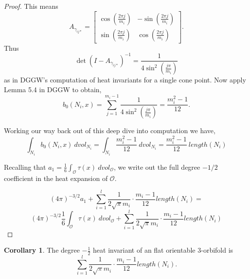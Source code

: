 \documentclass[12pt]{article}
\theoremstyle{definition}
\newtheorem{corollary}[theorem]{Corollary}
\begin{document}
\begin{proof}
This means $$A_{\gamma_{ij*}} = \begin{bmatrix}   \cos(\frac{2\pi j}{m_i}) & -\sin(\frac{2\pi j}{m_i}) \\ \sin(\frac{2\pi j}{m_i}) & \cos(\frac{2\pi j}{m_i}) \end{bmatrix}.$$  Thus $$\det(I-A_{\gamma_{ij*}})^{-1} = \frac{1}{4\sin^2(\frac{j\pi}{m_i})}$$ as in DGGW's computation of heat invariants for a single cone point.  Now apply Lemma 5.4 in DGGW to obtain,
$$b_0(N_i, x) = \sum_{j=1}^{m_i-1}  \frac{1}{4\sin^2(\frac{j\pi}{m_i})} = \frac{m_i^2-1}{12}.$$


Working our way back out of this deep dive into computation we have,
$$\int_{N_i} b_0(N_i, x) \ dvol_{N_i} = \int_{N_i} \frac{m_i^2-1}{12} \ dvol_{N_i} = \frac{m_i^2-1}{12} \  length(N_i)$$

Recalling that $a_1=\frac{1}{6}\int_{\mathcal{O}} \tau(x) \ dvol_{\mathcal O}$, we write out the full degree $-1/2$ coefficient in the heat expansion of $\mathcal{O}$.

$$(4\pi)^{-3/2} a_1 + \sum_{i=1}^l \frac{1}{2\sqrt{\pi}m_i} \cdot \frac{m_i-1}{12} length(N_i) =$$
$$ (4\pi)^{-3/2} \frac{1}{6}\int_{\mathcal{O}} \tau(x) \ dvol_{\mathcal O}+\sum_{i=1}^l \frac{1}{2\sqrt{\pi}m_i} \cdot \frac{m_i-1}{12} length(N_i)$$

\end{proof}


 \begin{corollary}  The degree $-\frac{1}{2}$ heat invariant of an flat orientable $3$-orbifold is
 $$ \sum_{i=1}^l \frac{1}{2\sqrt{\pi}m_i} \cdot \frac{m_i-1}{12} length(N_i).$$
  \end{corollary}
  
\end{document}
